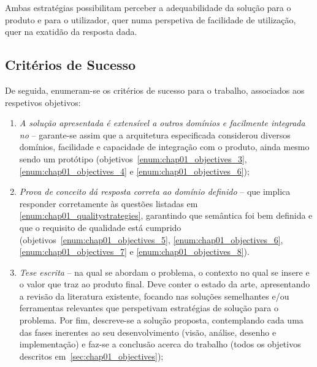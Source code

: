 Ambas estratégias possibilitam perceber a adequabilidade da solução para o produto e para o utilizador, quer numa perspetiva de facilidade de utilização, quer na exatidão da resposta dada.

\subsection{Critérios de Sucesso}
De seguida, enumeram-se os critérios de sucesso para o trabalho, associados aos respetivos objetivos:

\begin{enumerate}
    \item
    {
        \textit{A solução apresentada é extensível a outros domínios e facilmente integrada no {\productname}} -- garante-se assim que a arquitetura especificada considerou diversos domínios, facilidade e capacidade de integração com o produto, ainda mesmo sendo um protótipo (objetivos~\ref{enum:chap01_objectives_3}, \ref{enum:chap01_objectives_4} e \ref{enum:chap01_objectives_6});
    }
    \item
    {
        \textit{Prova de conceito dá resposta correta ao domínio definido} -- que implica responder corretamente às questões listadas em \ref{enum:chap01_qualitystrategies}, garantindo que semântica foi bem definida e que o requisito de qualidade está cumprido (objetivos~\ref{enum:chap01_objectives_5}, \ref{enum:chap01_objectives_6}, \ref{enum:chap01_objectives_7} e \ref{enum:chap01_objectives_8}).
    }
    \item 
    {
        \textit{Tese escrita} -- na qual se abordam o problema, o contexto no qual se insere e o valor que traz ao produto final. Deve conter o estado da arte, apresentando a revisão da literatura existente, focando nas soluções semelhantes e/ou ferramentas relevantes que perspetivam estratégias de solução para o problema. Por fim, descreve-se a solução proposta, contemplando cada uma das fases inerentes ao seu desenvolvimento (visão, análise, desenho e implementação) e faz-se a conclusão acerca do trabalho (todos os objetivos descritos em~\ref{sec:chap01_objectives});
    }
\end{enumerate}
